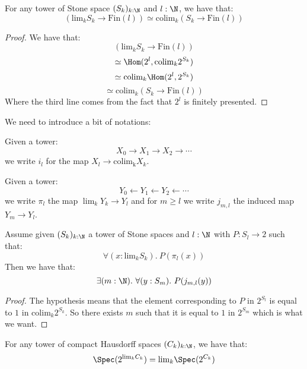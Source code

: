 \begin{lemma}\label{factorisation-stone-finite}
For any tower of Stone space $(S_k)_{k:\N}$ and $l:\N$, we have that:
\[\left(\mathrm{lim}_kS_k\to \mathrm{Fin}(l)\right) \simeq \mathrm{colim}_k (S_k\to \mathrm{Fin}(l))\]
\end{lemma}

\begin{proof}
We have that:
\[\left(\mathrm{lim}_kS_k\to \mathrm{Fin}(l)\right) \]
\[\simeq \Hom(2^l, \mathrm{colim}_k 2^{S_k})\]
\[\simeq \mathrm{colim}_k \Hom(2^l, 2^{S_k}) \]
\[\simeq \mathrm{colim}_k (S_k\to \mathrm{Fin}(l))\]
Where the third line comes from the fact that $2^l$ is finitely presented.
\end{proof}

We need to introduce a bit of notations:

Given a tower: 
\[X_0 \to X_1\to X_2\to \cdots \]
we write $i_l$ for the map $X_l\to\mathrm{colim_k}X_k$.

Given a tower: 
\[Y_0 \leftarrow Y_1\leftarrow Y_2 \leftarrow \cdots\]
we write $\pi_l$ the map $\lim_k Y_k\to Y_l$ and for $m\geq l$ we write $j_{m,l}$ the induced map $Y_m\to Y_l$.

\begin{lemma}\label{sequential-limits-decidable}
Assume given $(S_k)_{k:\N}$ a tower of Stone spaces and $l:\N$ with $P:S_l\to 2$ such that:
\[\forall (x:\mathrm{lim}_kS_k).\ P(\pi_l(x))\]
Then we have that:
\[\exists(m:\N).\ \forall(y:S_m).\ P(j_{m,l}(y))\]
\end{lemma}

\begin{proof}
The hypothesis means that the element corresponding to $P$ in $2^{S_l}$ is equal to $1$ in $\mathrm{colim}_k2^{S_k}$. So there exists $m$ such that it is equal to $1$ in $2^{S_m}$ which is what we want.
\end{proof}

\begin{lemma}\label{stonification-sequential-limits}
For any tower of compact Hausdorff spaces $(C_k)_{k:\N}$, we have that:
\[\Spec(2^{\mathrm{lim}_k C_k}) = \mathrm{lim}_k\Spec(2^{C_k})\]
\end{lemma}

